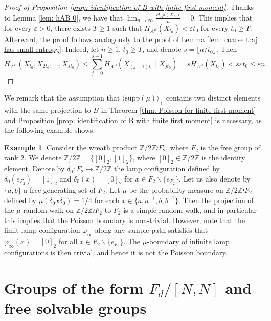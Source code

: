 \documentclass[reqno,oneside,11pt]{amsart}
\newcommand{\Z}{\mathbb{Z}}
\newcommand{\supp}[1]{\mathrm{supp}(#1)}
\theoremstyle{plain}
\theoremstyle{definition}
\newtheorem{exmp}[thm]{Example} %
\begin{document}
\begin{proof}[Proof of Proposition \ref{prop: identification of B with finite first moment}]
	
	Thanks to Lemma \ref{lem: hAB 0}, we have that 
	\( \lim_{n\to \infty}\frac{H_{A^B}(X_n)}{n}=0. \) This implies that for every $\varepsilon>0$, there exists $T\ge 1$ such that $	H_{A^B}(X_{t_0})<\varepsilon t_0$ for every $t_0\ge T$. Afterward, the proof follows analogously to the proof of Lemma \ref{lem: coarse traj has small entropy}. Indeed, let $n\ge 1$, $t_0\ge T$, and denote $s=\lfloor n/t_0\rfloor.$ Then
	\begin{equation*}
		H_{A^B}(X_{t_0},X_{2t_0},\ldots, X_{st_0})\le\sum_{j=0}^{s-1}H_{A^B}\left(X_{(j+1)t_0}\mid X_{jt_0}\right)
		= sH_{A^B}(X_{t_0})
		< s\varepsilon t_0\le \varepsilon n.
	\end{equation*}		
\end{proof}
We remark that the assumption that $\langle \supp{\mu}\rangle_{+}$ contains two distinct elements with the same projection to $B$ in Theorem \ref{thm: Poisson for finite first moment} and Proposition \ref{prop: identification of B with finite first moment} is necessary, as the following example shows.
\begin{exmp}\label{example: conjugate base group}
	Consider the wreath product $\Z/2\Z\wr F_2$, where $F_2$ is the free group of rank $2$. We denote $\Z/2\Z=\{[0]_2,[1]_2\}$, where $[0]_2\in \Z/2\Z$ is the identity element. Denote by $\delta_0:F_2\to \Z/2\Z$ the lamp configuration defined by $\delta_0(e_{F_2})=[1]_2$ and $\delta_0(x)=[0]_2$ for $x\in F_2\backslash \{e_{F_2}\}$. Let us also denote by $\{a,b\}$ a free generating set of $F_2$. Let $\mu$ be the probability measure on $\Z/2\Z\wr F_2$ defined by $\mu(\delta_0 x \delta_0)=1/4$ for each $x \in \{ a,a^{-1},b,b^{-1}\}$. Then the projection of the $\mu$-random walk on $\Z/2\Z\wr F_2$ to $F_2$ is a simple random walk, and in particular this implies that the Poisson boundary is non-trivial. However, note that the limit lamp configuration $\varphi_{\infty}$ along any sample path satisfies that $\varphi_{\infty}(x)=[0]_2$ for all $x\in F_2\backslash\{ e_{F_2}\}$. The $\mu$-boundary of infinite lamp configurations is then trivial, and hence it is not the Poisson boundary.
\end{exmp}

\section{Groups of the form $F_d/[N,N]$ and free solvable groups} \label{section: free solvable groups}
\end{document}
